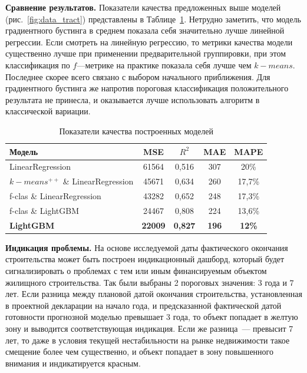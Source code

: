 \documentclass[12pt,a4paper]{article} %
\begin{document}
\textbf{Сравнение результатов.} Показатели качества предложенных выше моделей (рис.~\ref{fig:data_tract}) представлены в Таблице~\ref{Tab:3}. Нетрудно заметить, что модель градиентного бустинга в среднем показала себя значительно лучше линейной регрессии. Если смотреть на линейную регрессию, то метрики качества модели существенно лучше при применении предварительной группировки, при этом классификация по $f$---метрике
на практике показала себя лучше чем $k-means$. Последнее скорее всего связано с выбором начального приближения. Для градиентного бустинга же напротив пороговая классификация положительного результата не принесла, и оказывается лучше использовать алгоритм в классической вариации. 
\begin{table}[h]
	\centering
	\begin{tabular}{lcccc}
		
		\hline  Модель& MSE &  $R^2$ & MAE & MAPE \\
		\hline LinearRegression  & 61564 & 0,516 & 307 & 20\%\\
		$k-means^{++}$ \& LinearRegression  & 45671 & 0,634 & 260& 17,7\%\\
		f-clas \& LinearRegression & 43282 & 0,652 & 248 & 17,3\%\\
		f-clas \& LightGBM & 24467 &  0,808 & 224 & 13,6\%\\
		\hline
		\textbf{LightGBM}&  \textbf{22009}& \textbf{0,827}& \textbf{196}&
		\textbf{12\%}   \\
		\hline 
	\end{tabular}
	
	\caption{Показатели качества построенных моделей}
	\label{Tab:3}
\end{table}

\textbf{Индикация проблемы.} 
На основе исследуемой даты фактического окончания строительства может быть построен индикационный дашборд, который будет сигнализировать о проблемах с тем или иным финансируемым объектом жилищного строительства. 
Так были выбраны 2 пороговых значения: $3$ года и $7$ лет. Если разница между плановой датой окончания строительства, установленная в проектной декларации на начало года, и предсказанной фактической датой готовности прогнозной моделью превышает 3 года, то объект попадает в желтую зону и выводится соответствующая индикация. Если же разница~--- превысит 7 лет, то даже в условия текущей нестабильности на рынке недвижимости такое смещение более чем существенно, и объект попадает в зону повышенного внимания и индикатируется красным.
\end{document}
